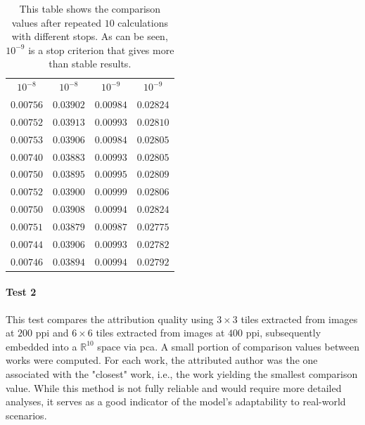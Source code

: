 \begin{toReview}
	\begin{table}[H]
		\centering
		\begin{tabular}{|c|c|c|c|}
			\hline
			\rowcolor{ambra}
			\multicolumn{4}{|c|}{stop criteria} \\
			\hline
			\rowcolor{lavender}
			$10^{-8}$ & $10^{-8}$ & $10^{-9}$ & $10^{-9}$ \\
			\hline
			$0.00756$ & $0.03902$ & $0.00984$ & $0.02824$ \\
			\hline
			$0.00752$ & $0.03913$ & $0.00993$ & $0.02810$ \\
			\hline
			$0.00753$ & $0.03906$ & $0.00984$ & $0.02805$ \\
			\hline
			$0.00740$ & $0.03883$ & $0.00993$ & $0.02805$ \\
			\hline
			$0.00750$ & $0.03895$ & $0.00995$ & $0.02809$ \\
			\hline
			$0.00752$ & $0.03900$ & $0.00999$ & $0.02806$ \\
			\hline
			$0.00750$ & $0.03908$ & $0.00994$ & $0.02824$ \\
			\hline
			$0.00751$ & $0.03879$ & $0.00987$ & $0.02775$ \\
			\hline
			$0.00744$ & $0.03906$ & $0.00993$ & $0.02782$ \\
			\hline
			$0.00746$ & $0.03894$ & $0.00994$ & $0.02792$ \\
			\hline
		\end{tabular}
		\caption[Stability of comparison algorithm for $6\times6$ tiles]{This table shows the comparison values after repeated $10$ calculations with different stops. As can be seen, $10^{-9}$ is a stop criterion that gives more than stable results.}
		\label{tab:distStability_tuning}
	\end{table}

	\paragraph{Test 2}
	This test compares the attribution quality using $3\times3$ tiles extracted from images at $200$ \gls{ppi} and $6\times6$ tiles extracted from images at $400$ \gls{ppi}, subsequently embedded into a $\mathbb{R}^{10}$ space via \gls{pca}. A small portion of comparison values between works were computed. For each work, the attributed author was the one associated with the "closest" work, i.e., the work yielding the smallest comparison value. While this method is not fully reliable and would require more detailed analyses, it serves as a good indicator of the model's adaptability to real-world scenarios.


\end{toReview}

